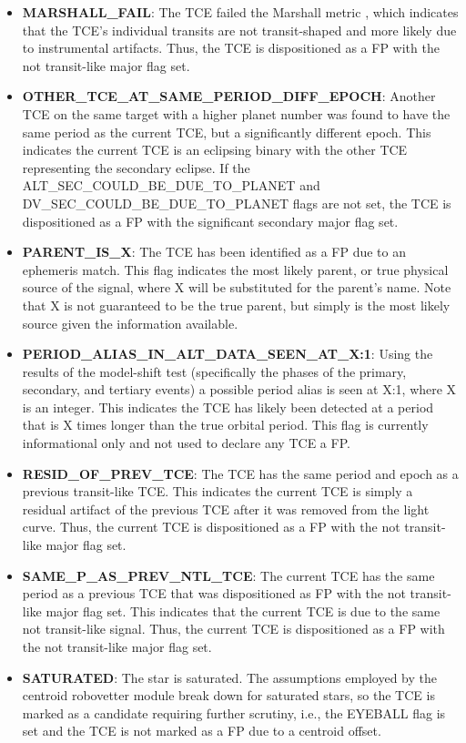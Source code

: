 \begin{itemize}
\item[] \textbf{MARSHALL\_FAIL}: The TCE failed the Marshall metric \citep{Mullally2015b}, which indicates that the TCE's individual transits are not transit-shaped and more likely due to instrumental artifacts. Thus, the TCE is dispositioned as a FP with the not transit-like major flag set.
\item[] \textbf{OTHER\_TCE\_AT\_SAME\_PERIOD\_DIFF\_EPOCH}: Another TCE on the same target with a higher planet number was found to have the same period as the current TCE, but a significantly different epoch. This indicates the current TCE is an eclipsing binary with the other TCE representing the secondary eclipse. If the ALT\_SEC\_COULD\_BE\_DUE\_TO\_PLANET and DV\_SEC\_COULD\_BE\_DUE\_TO\_PLANET flags are not set, the TCE is dispositioned as a FP with the significant secondary major flag set.
\item[] \textbf{PARENT\_IS\_X}: The TCE has been identified as a FP due to an ephemeris match. This flag indicates the most likely parent, or true physical source of the signal, where X will be substituted for the parent's name. Note that X is not guaranteed to be the true parent, but simply is the most likely source given the information available.
\item[] \textbf{PERIOD\_ALIAS\_IN\_ALT\_DATA\_SEEN\_AT\_X:1}: Using the results of the model-shift test (specifically the phases of the primary, secondary, and tertiary events) a possible period alias is seen at X:1, where X is an integer. This indicates the TCE has likely been detected at a period that is X times longer than the true orbital period. This flag is currently informational only and not used to declare any TCE a FP.
\item[] \textbf{RESID\_OF\_PREV\_TCE}: The TCE has the same period and epoch as a previous transit-like TCE. This indicates the current TCE is simply a residual artifact of the previous TCE after it was removed from the light curve. Thus, the current TCE is dispositioned as a FP with the not transit-like major flag set.
\item[] \textbf{SAME\_P\_AS\_PREV\_NTL\_TCE}: The current TCE has the same period as a previous TCE that was dispositioned as FP with the not transit-like major flag set. This indicates that the current TCE is due to the same not transit-like signal. Thus, the current TCE is dispositioned as a FP with the not transit-like major flag set.
\item[] \textbf{SATURATED}: The star is saturated. The assumptions employed by the centroid robovetter module break down for saturated stars, so the TCE is marked as a candidate requiring further scrutiny, i.e., the EYEBALL flag is set and the TCE is not marked as a FP due to a centroid offset.

\end{itemize}
